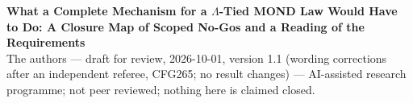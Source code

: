 \documentclass[10pt]{article}
\begin{document}
\begin{center}
{\Large\bfseries What a Complete Mechanism for a $\Lambda$-Tied MOND Law Would Have to Do: A Closure Map of Scoped No-Gos and a Reading of the Requirements}\\[6pt]
{\small The authors --- draft for review, 2026-10-01, version 1.1 (wording corrections after an independent referee, CFG265; no result changes) --- AI-assisted research programme; not peer reviewed; nothing here is claimed closed.}
\end{center}

\end{document}
